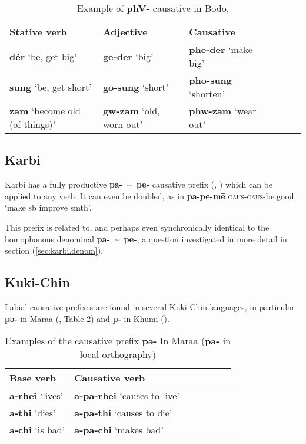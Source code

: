\documentclass[oneside,a4paper,11pt]{article}
\newcommand{\ipa}[1]{\textbf{{\phon\mbox{#1}}}} %
\newcommand{\forme}[2]{\ipa{#1} `#2'}
\newcommand{\refb}[1]{(\ref{#1})}
\newcommand{\tld}{\textasciitilde{}}
\begin{document}
\begin{table}[H]
\caption{Example of \ipa{phV-} causative in Bodo, \citet[54]{delancey15adjectival}} \label{tab:bodo.phV}
\begin{tabular}{lllllll}
\toprule
Stative verb & Adjective & Causative \\
\midrule
\forme{dér}{be, get big} & \forme{ge-der}{big} & \forme{phe-der}{make big} \\
\forme{sung}{be, get short} & \forme{go-sung}{short} & \forme{pho-sung}{shorten} \\
\forme{zam}{become old (of things)} & \forme{gw-zam}{old, worn out} & \forme{phw-zam}{wear out} \\
\bottomrule
\end{tabular}
\end{table}

\subsection{Karbi} \label{sec:karbi}
Karbi has a fully productive \ipa{pa- \tld{} pe-} causative prefix (\citealt[93-4]{gruessner78mikir}, \citealt[238-9]{konnerth14karbi}) which can be applied to any verb. It can even be doubled, as in \ipa{pa-pe-mē} \textsc{caus-caus}-be.good `make sb improve smth'.

This prefix is related to, and perhaps even synchronically identical to the homophonous denominal \ipa{pa- \tld{} pe-}, a question investigated in more detail in section \refb{sec:karbi.denom}.

\subsection{Kuki-Chin}  \label{sec:kc}
Labial causative prefixes are found in several Kuki-Chin languages, in particular \ipa{pə-} in Maraa (\citealt[139]{hartmann01prenasalization}, Table \ref{tab:maraa}) and \ipa{p-} in Khumi (\citealt[99]{peterson10elaborate}). 

\begin{table}[H]
\caption{Examples of the causative prefix \ipa{pə-} In Maraa (\ipa{pa-} in local orthography)} \centering \label{tab:maraa}
\begin{tabular}{lllllll}
\toprule
Base verb & Causative verb \\
\midrule
\forme{a-rhei}{lives} & \forme{a-pa-rhei}{causes to live} \\
\forme{a-thi}{dies} & \forme{a-pa-thi}{causes to die} \\
\forme{a-chi}{is bad} & \forme{a-pa-chi}{makes bad} \\
\bottomrule
\end{tabular}
\end{table}
\end{document}
